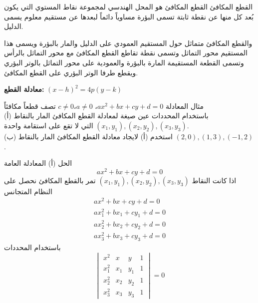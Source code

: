     \begin{frame}
    	\begin{exampleblock}{القطع المكافئ}
    		القطع المكافئ هو المحل الهندسي لمجموعة نقاط المستوي التي يكون بُعد كل منها عن نقطة ثابتة تسمى البؤرة مساوياً دائماً لبعدها عن مستقيم معلوم يسمى الدليل.
    		
    		والقطع المكافئ متماثل حول المستقيم العمودي على الدليل والمار بالبؤرة ويسمى هذا المستقيم محور التماثل وتسمى نقطة تقاطع القطع المكافئ مع محور التماثل بالرأس وتسمى القطعة المستقيمة المارة بالبؤرة والعمودية على محور التماثل بالوتر البؤري ويقطع طرفا الوتر البؤري على القطع المكافئ.
    	\end{exampleblock}
    	
    	\textbf{معادلة القطع:} \quad $(x-h)^2 = 4p(y-k)$
    \end{frame}
    
    \begin{frame}
    	\begin{exampleblock}{مثال}
    		المعادلة $ax^2+bx+cy+d=0$، $a\neq0$،$c\neq0$ تصف قطعاً مكافئاً\\
    		(أ) باستخدام المحددات عين صيغة لمعادلة القطع المكافئ المار بالنقاط $(x_1, y_1) , (x_2, y_2) , (x_3, y_3)$ التي لا تقع على استقامة واحدة.\\
    		(ب) استخدم (أ) لايجاد معادلة القطع المكافئ المار بالنقاط 
    		$(2, 0), (1, 3), (-1,2)$.
    		
    	\end{exampleblock}
    	
    	
    \end{frame}
    
    \begin{frame}
    	\begin{exampleblock}{الحل}
    		(أ) المعادلة العامة 
    		\[
    		ax^2+bx+cy+d=0
    		\]
    		اذا كانت النقاط $(x_1,y_1),(x_2,y_2),(x_3,y_3)$ تمر بالقطع المكافئ نحصل على النظام المتجانس
    		\begin{align*}
    			ax^2+bx+cy+d=0\\
    			ax_1^2+bx_1+cy_1+d=0\\
    			ax_2^2+bx_2+cy_2+d=0\\
    			ax_3^2+bx_3+cy_3+d=0
    		\end{align*}
    		باستخدام المحددات
    		\[
    		\begin{vmatrix}
    		x^2  & x & y & 1\\
    		x_1^2  & x_1 & y_1 & 1\\
    		x_2^2  & x_2 & y_2 & 1\\
    		x_3^2  & x_3 & y_3 & 1
    		\end{vmatrix} = 0
    		\]
    	\end{exampleblock}
    \end{frame}
    
